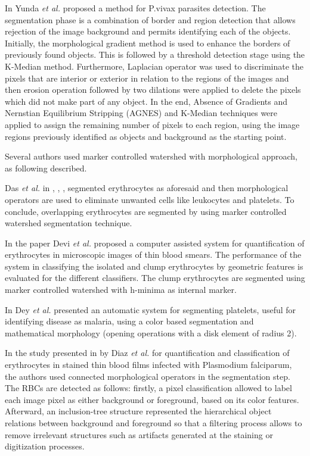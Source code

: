 \documentclass[sensors,review,submit,moreauthors,pdftex,10pt,a4paper]{mdpi}
\begin{document}
	In \cite{Yunda2012} Yunda \emph{et al.} proposed a method for P.vivax parasites detection. The segmentation phase is a combination of border and region detection that allows rejection of the image background and permits identifying each of the objects. Initially, the morphological gradient method is used to enhance the borders of previously found objects. This is followed by a threshold detection stage using the K-Median method.
	Furthermore, Laplacian operator was used to discriminate the pixels that are interior or exterior in relation to the regions of the images and then erosion operation followed by two dilations were applied to delete the pixels which did not make part of any object. In the end, Absence of Gradients and Nernstian Equilibrium Stripping (AGNES) and K-Median techniques were applied to assign the remaining number of pixels to each region, using the image regions previously identified as objects and background as the starting point.
	
	Several authors used marker controlled watershed \cite{Soille2004} with morphological approach, as following described.
	
	Das \emph{et al.} in \cite{Das2011}, \cite{Das2013}, \cite{Das2014}, \cite{Das2015} segmented erythrocytes as aforesaid and then morphological operators are used to eliminate unwanted cells like leukocytes and platelets. To conclude, overlapping erythrocytes are segmented by using marker controlled watershed segmentation technique.
	
	In the paper \cite{Devi2017} Devi \emph{et al.} proposed a computer assisted system for quantification of erythrocytes in microscopic images of thin blood smears. The performance of the system in classifying the isolated and clump erythrocytes by geometric features is evaluated for the different classifiers. The clump erythrocytes are segmented using marker controlled watershed with h-minima as internal marker.
	
	In \cite{Dey2015} Dey \emph{et al.} presented an automatic system for segmenting platelets, useful for identifying disease as malaria, using a color based segmentation and mathematical morphology (opening operations with a disk element of radius 2).
	
	In the study presented in \cite{Diaz2009} by Diaz \emph{et al.} for quantification and classification of erythrocytes in stained thin blood films infected with Plasmodium falciparum, the authors used connected morphological operators in the segmentation step. The RBCs are detected as follows: firstly, a pixel classification allowed to label each image pixel as either background or foreground, based on its color features. Afterward, an inclusion-tree structure represented the hierarchical object relations between background and foreground so that a filtering process allows to remove irrelevant structures such as artifacts generated at the staining or digitization processes.
	
\end{document}
